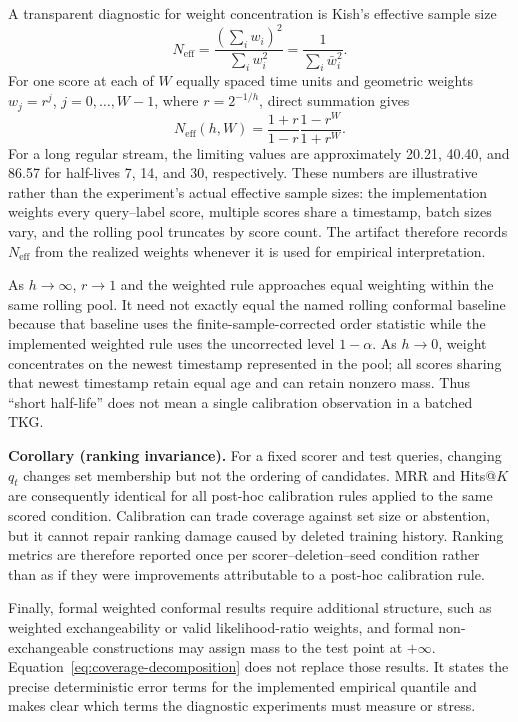 A transparent diagnostic for weight concentration is Kish's effective sample
size
\[
  N_{\mathrm{eff}}
  =\frac{(\sum_i w_i)^2}{\sum_i w_i^2}
  =\frac{1}{\sum_i\bar w_i^2}.
\]
For one score at each of \(W\) equally spaced time units and geometric weights
\(w_j=r^j\), \(j=0,\ldots,W-1\), where \(r=2^{-1/h}\), direct summation gives
\[
  N_{\mathrm{eff}}(h,W)
  =\frac{1+r}{1-r}\frac{1-r^W}{1+r^W}.
  \tag{2}\label{eq:neff-geometric}
\]
For a long regular stream, the limiting values are approximately 20.21, 40.40,
and 86.57 for half-lives 7, 14, and 30, respectively.  These numbers are
illustrative rather than the experiment's actual effective sample sizes: the
implementation weights every query--label score, multiple scores share a
timestamp, batch sizes vary, and the rolling pool truncates by score count.
The artifact therefore records \(N_{\mathrm{eff}}\) from the realized weights
whenever it is used for empirical interpretation.

As \(h\rightarrow\infty\), \(r\rightarrow1\) and the weighted rule approaches
equal weighting within the same rolling pool.  It need not exactly equal the
named rolling conformal baseline because that baseline uses the
finite-sample-corrected order statistic while the implemented weighted rule uses the
uncorrected level \(1-\alpha\).  As \(h\rightarrow0\), weight concentrates on
the newest timestamp represented in the pool; all scores sharing that newest
timestamp retain equal age and can retain nonzero mass.  Thus ``short
half-life'' does not mean a single calibration observation in a batched TKG.

\noindent\textbf{Corollary (ranking invariance).}\quad
For a fixed scorer and test queries, changing \(q_t\) changes set membership but
not the ordering of candidates.  MRR and Hits@\(K\) are consequently identical
for all post-hoc calibration rules applied to the same scored condition.
Calibration can trade coverage against set size or abstention, but it cannot
repair ranking damage caused by deleted training history.  Ranking metrics are
therefore reported once per scorer--deletion--seed condition rather than as if
they were improvements attributable to a post-hoc calibration rule.

Finally, formal weighted conformal results require additional structure, such
as weighted exchangeability or valid likelihood-ratio weights, and formal
non-exchangeable constructions may assign mass to the test point at
\(+\infty\).  Equation~\eqref{eq:coverage-decomposition} does not replace
those results.  It states the precise deterministic error terms for the
implemented empirical quantile and makes clear which terms the diagnostic
experiments must measure or stress.
